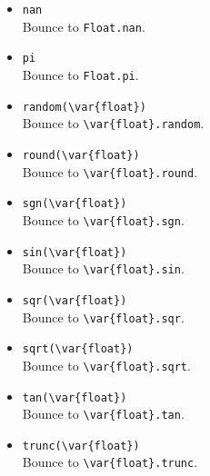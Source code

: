 \begin{itemize}
\item \lstinline|nan|\\
  Bounce to \lstinline|Float.nan|.

\item \lstinline|pi|\\
  Bounce to \lstinline|Float.pi|.

\item \lstinline|random(\var{float})|\\
  Bounce to \lstinline|\var{float}.random|.

\item \lstinline|round(\var{float})|\\
  Bounce to \lstinline|\var{float}.round|.

\item \lstinline|sgn(\var{float})|\\
  Bounce to \lstinline|\var{float}.sgn|.

\item \lstinline|sin(\var{float})|\\
  Bounce to \lstinline|\var{float}.sin|.

\item \lstinline|sqr(\var{float})|\\
  Bounce to \lstinline|\var{float}.sqr|.

\item \lstinline|sqrt(\var{float})|\\
  Bounce to \lstinline|\var{float}.sqrt|.

\item \lstinline|tan(\var{float})|\\
  Bounce to \lstinline|\var{float}.tan|.

\item \lstinline|trunc(\var{float})|\\
  Bounce to \lstinline|\var{float}.trunc|.
\end{itemize}


